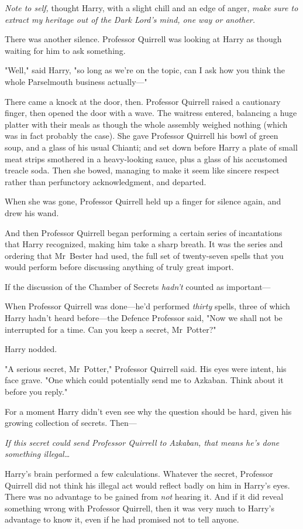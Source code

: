 \emph{Note to self,} thought Harry, with a slight chill and an edge of anger,
\emph{make sure to extract my heritage out of the Dark Lord's mind, one way or
another.}

There was another silence. Professor Quirrell was looking at Harry as though
waiting for him to ask something.

"Well," said Harry, "so long as we're on the topic, can I ask how you think the
whole Parselmouth business actually—"

There came a knock at the door, then. Professor Quirrell raised a cautionary
finger, then opened the door with a wave. The waitress entered, balancing a
huge platter with their meals as though the whole assembly weighed nothing
(which was in fact probably the case). She gave Professor Quirrell his bowl of
green soup, and a glass of his usual Chianti; and set down before Harry a plate
of small meat strips smothered in a heavy-looking sauce, plus a glass of his
accustomed treacle soda. Then she bowed, managing to make it seem like sincere
respect rather than perfunctory acknowledgment, and departed.

When she was gone, Professor Quirrell held up a finger for silence again, and
drew his wand.

And then Professor Quirrell began performing a certain series of incantations
that Harry recognized, making him take a sharp breath. It was the series and
ordering that Mr~Bester had used, the full set of twenty-seven spells that you
would perform before discussing anything of truly great import.

If the discussion of the Chamber of Secrets \emph{hadn't} counted as
important—

When Professor Quirrell was done—he'd performed \emph{thirty} spells, three
of which Harry hadn't heard before—the Defence Professor said, "Now we shall
not be interrupted for a time. Can you keep a secret, Mr~Potter?"

Harry nodded.

"A serious secret, Mr~Potter," Professor Quirrell said. His eyes were intent,
his face grave. "One which could potentially send me to Azkaban. Think about it
before you reply."

For a moment Harry didn't even see why the question should be hard, given his
growing collection of secrets. Then—

\emph{If this secret could send Professor Quirrell to Azkaban, that means he's
done something illegal…}

Harry's brain performed a few calculations. Whatever the secret, Professor
Quirrell did not think his illegal act would reflect badly on him in Harry's
eyes. There was no advantage to be gained from \emph{not} hearing it. And if it
did reveal something wrong with Professor Quirrell, then it was very much to
Harry's advantage to know it, even if he had promised not to tell anyone.

